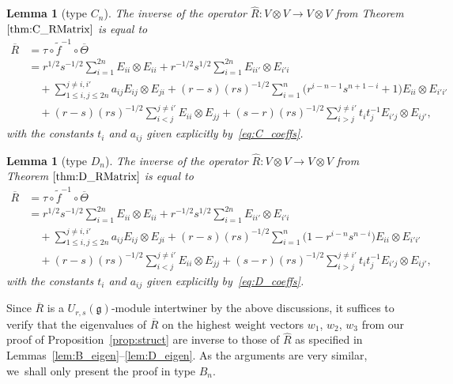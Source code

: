 \documentclass[10pt,a4paper]{amsart}
\numberwithin{equation}{section}
\newtheorem{Lemma}[Theorem]{Lemma}
\newcommand{\fg}{\mathfrak{g}}
\newcommand{\uu}{U_{r,s}(\fg)}
\begin{document}
\begin{Lemma}[type $C_{n}$]%
The inverse of the operator $\hat{R}\colon V \otimes V \to V \otimes V$ from Theorem $\ref{thm:C_RMatrix}$ is equal to
\begin{align}
 \overline{R} &= \tau \circ \widetilde{f}^{-1} \circ \overline{\Theta} \nonumber\\
 &=
 r^{1/2}s^{-1/2}\sum_{i = 1}^{2n} E_{ii} \otimes E_{ii}
 + r^{-1/2}s^{1/2}\sum_{i = 1}^{2n} E_{ii'} \otimes E_{i'i} \nonumber\\
 &\quad + \sum_{1\leq i,j\leq 2n}^{j\ne i,i'} a_{ij}E_{ij} \otimes E_{ji}
 + (r - s)(rs)^{-1/2}\sum_{i = 1}^{n}\bigl(r^{i - n- 1}s^{n + 1 - i} + 1\bigr)E_{ii} \otimes E_{i'i'}\nonumber \\
 &\quad + (r -s)(rs)^{-1/2}\sum_{i < j}^{j\neq i'} E_{ii} \otimes E_{jj}
 + (s - r)(rs)^{-1/2}\sum_{i > j}^{j\neq i'} t_{i}t_{j}^{-1}E_{i'j} \otimes E_{ij'},\label{eq:C_Inv}
\end{align}
with the constants $t_{i}$ and $a_{ij}$ given explicitly by~\eqref{eq:C_coeffs}.
\end{Lemma}

\begin{Lemma}[type $D_{n}$]\label{lem:D_Inverse}
The inverse of the operator $\hat{R}\colon V \otimes V \to V \otimes V$ from Theorem $\ref{thm:D_RMatrix}$ is equal to
\begin{align}
 \overline{R} &= \tau \circ \widetilde{f}^{-1} \circ \overline{\Theta} \nonumber\\
 &=r^{1/2}s^{-1/2}\sum_{i = 1}^{2n} E_{ii} \otimes E_{ii}
 + r^{-1/2}s^{1/2}\sum_{i = 1}^{2n} E_{ii'} \otimes E_{i'i} \nonumber\\
 &\quad + \sum_{1\leq i,j\leq 2n}^{j \neq i,i'} a_{ij}E_{ij} \otimes E_{ji}
 + (r - s)(rs)^{-1/2}\sum_{i = 1}^{n}\bigl(1 - r^{i- n}s^{n - i}\bigr) E_{ii} \otimes E_{i'i'} \nonumber\\
 &\quad + (r -s)(rs)^{-1/2}\sum_{i < j}^{j \neq i'} E_{ii} \otimes E_{jj}
 + (s - r)(rs)^{-1/2}\sum_{i > j}^{j \neq i'} t_{i}t_{j}^{-1}E_{i'j} \otimes E_{ij'},\label{eq:D_Inv}
\end{align}
with the constants $t_{i}$ and $a_{ij}$ given explicitly by~\eqref{eq:D_coeffs}.
\end{Lemma}

Since $\overline{R}$ is a $\uu$-module intertwiner by the above discussions, it suffices to verify that the eigenvalues of $\overline{R}$ on the highest weight vectors $w_1$, $w_2$, $w_3$ from our proof of Proposition~\ref{prop:struct} are inverse to those of $\hat{R}$ as specified in Lemmas~\ref{lem:B_eigen}--\ref{lem:D_eigen}. As the arguments are very similar, we~shall only present the proof in type $B_{n}$.
\end{document}
